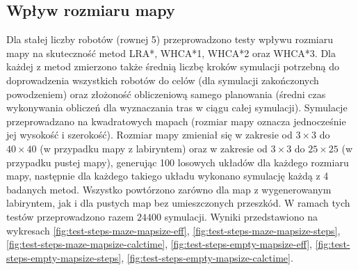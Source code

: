 \subsection{Wpływ rozmiaru mapy} %
\label{ch:tests-function-mapsize}
Dla stałej liczby robotów (rownej 5) przeprowadzono testy wpływu rozmiaru mapy na skuteczność metod LRA*, WHCA*1, WHCA*2 oraz WHCA*3.
Dla każdej z metod zmierzono także średnią liczbę kroków symulacji potrzebną do doprowadzenia wszystkich robotów do celów (dla symulacji zakończonych powodzeniem) oraz złożoność obliczeniową samego planowania (średni czas wykonywania obliczeń dla wyznaczania tras w ciągu całej symulacji).
Symulacje przeprowadzano na kwadratowych mapach (rozmiar mapy oznacza jednocześnie jej wysokość i szerokość).
Rozmiar mapy zmieniał się w zakresie od $3 \times 3$ do $40 \times 40$ (w przypadku mapy z labiryntem) oraz w zakresie od $3 \times 3$ do $25 \times 25$ (w przypadku pustej mapy), generując 100 losowych układów dla każdego rozmiaru mapy, następnie dla każdego takiego układu wykonano symulację każdą z 4 badanych metod.
Wszystko powtórzono zarówno dla map z wygenerowanym labiryntem, jak i dla pustych map bez umieszczonych przeszkód.
W ramach tych testów przeprowadzono razem $24 400$ symulacji.
Wyniki przedstawiono na wykresach \ref{fig:test-steps-maze-mapsize-eff}, \ref{fig:test-steps-maze-mapsize-steps}, \ref{fig:test-steps-maze-mapsize-calctime}, \ref{fig:test-steps-empty-mapsize-eff}, \ref{fig:test-steps-empty-mapsize-steps}, \ref{fig:test-steps-empty-mapsize-calctime}.


